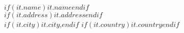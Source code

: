 $if(it.name)$$it.name$$endif$\\
$if(it.address)$$it.address$$endif$\\
$if(it.city)$$it.city$,$endif$ $if(it.country)$$it.country$$endif$\\
